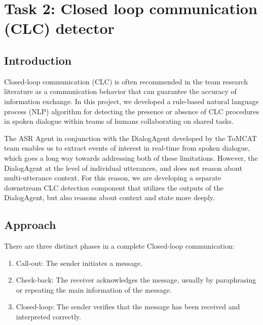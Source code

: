 \section{Task 2: Closed loop communication (CLC) detector}
\subsection{Introduction}

Closed-loop communication (CLC) is often recommended in the team research
literature as a communication behavior that can guarantee the accuracy of
information exchange. In this project, we developed a rule-based natural
language process (NLP) algorithm for detecting the presence or absence of CLC
procedures in spoken dialogue within teams of humans collaborating on shared
tasks.

The ASR Agent in conjunction with the DialogAgent developed by the ToMCAT team
enables us to extract events of interest in real-time from spoken dialogue,
which goes a long way towards addressing both of these limitations. However,
the DialogAgent at the level of individual utterances, and does not reason
about multi-utterance context. For this reason, we are developing a separate
downstream CLC detection component that utilizes the outputs of the
DialogAgent, but also reasons about context and state more deeply.

\subsection{Approach}

There are three distinct phases in a complete Closed-loop communication:

\begin{enumerate}
    \item Call-out: The sender initiates a message.
    \item Check-back: The receiver acknowledges the message, usually by paraphrasing or repeating the main information of the message.
    \item Closed-loop: The sender verifies that the message has been received and interpreted correctly.
\end{enumerate}

